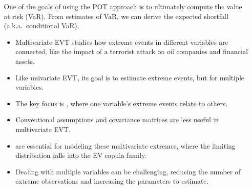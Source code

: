 \begin{mrkeybox}[title={VaR and expected shortfall}]
One of the goals of using the POT approach is to ultimately compute the value at risk (VaR).
From estimates of VaR, we can derive the expected shortfall (a.k.a.\ conditional VaR).
\end{mrkeybox}


\begin{itemize}
\item Multivariate EVT studies how extreme events in different variables are connected, like the
      impact of a terrorist attack on oil companies and financial assets.
\item Like univariate EVT, its goal is to estimate extreme events, but for multiple variables.
\item The key focus is , where one variable's extreme events relate to
      others.
\item Conventional assumptions and covariance matrices are less useful in multivariate EVT.
\item {} are essential for modeling these multivariate extremes, where the limiting
      distribution falls into the EV copula family.
\item Dealing with multiple variables can be challenging, reducing the number of extreme
      observations and increasing the parameters to estimate.
\end{itemize}

